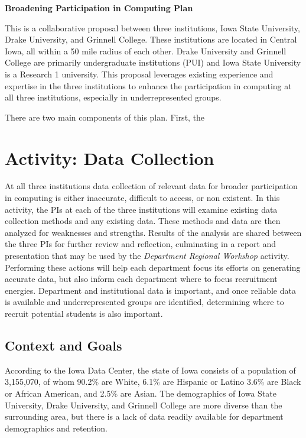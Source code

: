 \documentclass[11pt]{article}
\begin{document}
    \setcounter{page}{1}
    \begin{center}
        {\Large {\bf Broadening Participation in Computing Plan}}
    \end{center}

	This is a collaborative proposal between three institutions, Iowa State University, Drake University, and Grinnell College.  These institutions are located in Central Iowa, all within a 50 mile radius of each other.  Drake University and Grinnell College are primarily undergraduate institutions (PUI) and Iowa State University is a Research 1 university.  This proposal leverages existing experience and expertise in the three institutions to enhance the participation in computing at all three institutions, especially in underrepresented groups.

    There are two main components of this plan.  First, the 
    
    \section{Activity: Data Collection}
    At all three institutions data collection of relevant data for broader participation in computing is either inaccurate, difficult to access, or non existent.
    In this activity, the PIs at each of the three institutions will examine existing data collection methods and any existing data.
    These methods and data are then analyzed for weaknesses and strengths.  Results of the analysis are shared between the three PIs for further review and reflection, culminating in a report and presentation that may be used by the {\it Department Regional Workshop} activity.
    Performing these actions will help each department focus its efforts on generating accurate data, but also inform each department where to focus recruitment energies.
    Department and institutional data is important, and once reliable data is available and underrepresented groups are identified, determining where to recruit potential students is also important.
    
    \subsection{Context and Goals}
    According to the Iowa Data Center, the state of Iowa consists of a population of 3,155,070, of whom 90.2\% are White, 6.1\% are Hispanic or Latino 3.6\% are Black or African American, and 2.5\% are Asian.
    The demographics of Iowa State University, Drake University, and Grinnell College are more diverse than the surrounding area, but there is a lack of data readily available for department demographics and retention.
\end{document}
